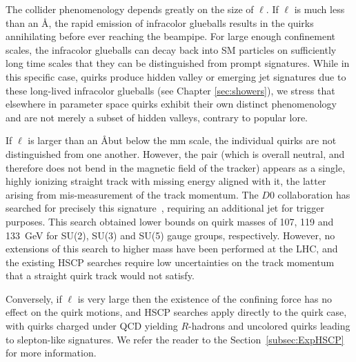 The collider phenomenology depends greatly on the size of $\ell$.  If $\ell$ is much less than an \AA, the rapid emission of infracolor glueballs results in the quirks annihilating before ever reaching the beampipe.  For large enough confinement scales, the infracolor glueballs can decay back into SM particles on sufficiently long time scales that they can be distinguished from prompt signatures.  While in this specific case, quirks produce hidden valley \cite{Strassler:2006im} or emerging jet \cite{Schwaller:2015gea} signatures due to these long-lived infracolor glueballs (see Chapter \ref{sec:showers}), we stress that elsewhere in parameter space quirks exhibit their own distinct phenomenology and are not merely a subset of hidden valleys, contrary to popular lore.

If $\ell$ is larger than an \AA but below the mm scale, the individual quirks are not distinguished from one another. However, the pair (which is overall neutral, and therefore does not bend in the magnetic field of the tracker) appears as a single, highly ionizing straight track with missing energy aligned with it, the latter arising from mis-measurement of the track momentum. The $D0$ collaboration has searched for precisely this signature~\cite{Abazov:2010yb}, requiring an additional jet for trigger purposes. This search obtained lower bounds on quirk masses of 107, 119 and 133~GeV for SU(2), SU(3) and SU(5) gauge groups, respectively. However, no extensions of this search to higher mass have been performed at the LHC, and the existing HSCP searches require low uncertainties on the track momentum that a straight quirk track would not satisfy.

Conversely, if $\ell$ is very large then the existence of the confining force has no effect on the quirk motions, and HSCP searches apply directly to the quirk case, with quirks charged under QCD yielding $R$-hadrons and uncolored quirks leading to slepton-like signatures. We refer the reader to the Section~\ref{subsec:ExpHSCP} for more information.

